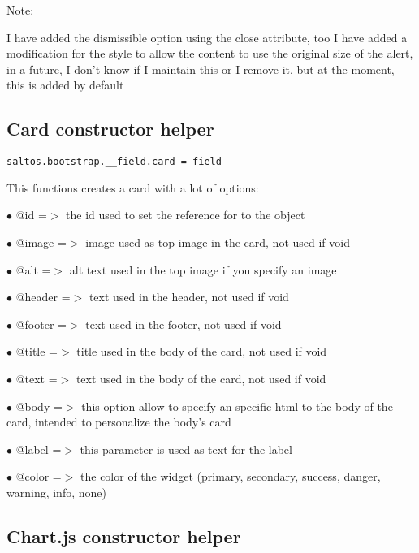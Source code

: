 \documentclass[a4paper]{book}
\begin{document}
Note:

I have added the dismissible option using the close attribute, too I have added a modification
for the style to allow the content to use the original size of the alert, in a future, I don't
know if I maintain this or I remove it, but at the moment, this is added by default

\hypertarget{toc486}{}
\subsection{Card constructor helper}

\begin{lstlisting}
saltos.bootstrap.__field.card = field
\end{lstlisting}

This functions creates a card with a lot of options:

\begin{compactitem}
\item[\color{myblue}$\bullet$] @id     =$>$ the id used to set the reference for to the object
\item[\color{myblue}$\bullet$] @image  =$>$ image used as top image in the card, not used if void
\item[\color{myblue}$\bullet$] @alt    =$>$ alt text used in the top image if you specify an image
\item[\color{myblue}$\bullet$] @header =$>$ text used in the header, not used if void
\item[\color{myblue}$\bullet$] @footer =$>$ text used in the footer, not used if void
\item[\color{myblue}$\bullet$] @title  =$>$ title used in the body of the card, not used if void
\item[\color{myblue}$\bullet$] @text   =$>$ text used in the body of the card, not used if void
\item[\color{myblue}$\bullet$] @body   =$>$ this option allow to specify an specific html to the body of the card, intended
           to personalize the body's card
\item[\color{myblue}$\bullet$] @label  =$>$ this parameter is used as text for the label
\item[\color{myblue}$\bullet$] @color  =$>$ the color of the widget (primary, secondary, success, danger, warning, info, none)
\end{compactitem}

\hypertarget{toc487}{}
\subsection{Chart.js constructor helper}
\end{document}
